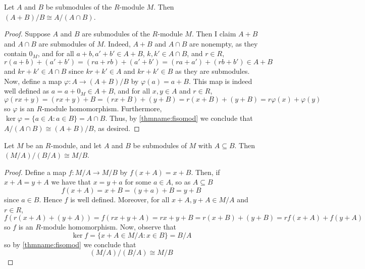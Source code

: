 \begin{namthm}\label{thmname:sisomod}
    Let $A$ and $B$ be submodules of the $R$-module $M$. Then $(A+B)/B\cong A/(A\cap B)$. 
\end{namthm}
\begin{proof}
    Suppose $A$ and $B$ are submodules of the $R$-module $M$. Then I claim $A+B$ and $A\cap B$ are submodules of $M$. Indeed, $A+B$ and $A\cap B$ are nonempty, as they contain $0_M$, and for all $a+b,a'+b' \in A+B$, $k,k' \in A\cap B$, and $r \in R$, \begin{equation*}
        r(a+b)+(a'+b') = (ra+rb)+(a'+b') = (ra+a')+(rb+b') \in A+B
    \end{equation*}
    and $kr+k' \in A\cap B$ since $kr+k' \in A$ and $kr+k' \in B$ as they are submodules. Now, define a map $\varphi:A\rightarrow (A+B)/B$ by $\varphi(a) = a+B$. This map is indeed well defined as $a = a+0_M \in A+B$, and for all $x,y \in A$ and $r \in R$, \begin{equation*}
        \varphi(rx+y) = (rx+y)+B = (rx+B)+(y+B) = r(x+B)+(y+B) = r\varphi(x)+\varphi(y)
    \end{equation*}
    so $\varphi$ is an $R$-module homomorphism. Furthermore, $\ker\varphi = \{a\in A: a \in B\} = A\cap B$. Thus, by \ref{thmname:fisomod} we conclude that $A/(A\cap B) \cong (A+B)/B$, as desired.
\end{proof}


\begin{namthm}\label{thmname:thisomod}
    Let $M$ be an $R$-module, and let $A$ and $B$ be submodules of $M$ with $A \subseteq B$. Then $(M/A)/(B/A) \cong M/B$. 
\end{namthm}
\begin{proof}
    Define a map $f:M/A\rightarrow M/B$ by $f(x+A) = x+B$. Then, if $x+A = y+A$ we have that $x=y+a$ for some $a \in A$, so as $A \subseteq B$ $$f(x+A) = x+B = (y+a) + B = y+B$$
    since $a \in B$. Hence $f$ is well defined. Moreover, for all $x+A,y+A \in M/A$ and $r \in R$, \begin{equation*}
        f(r(x+A)+(y+A)) = f(rx+y+A) = rx+y+B = r(x+B)+(y+B) = rf(x+A) + f(y+A)
    \end{equation*}
    so $f$ is an $R$-module homomorphism. Now, observe that $$\ker f = \{x+A \in M/A: x \in B\} = B/A$$
    so by \ref{thmname:fisomod} we conclude that \begin{equation*}
        (M/A)/(B/A) \cong M/B
    \end{equation*}
\end{proof}


